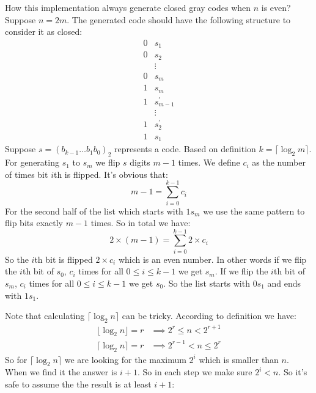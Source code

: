 \documentclass{book}
\begin{document}
	How this implementation always generate closed gray codes when $n$ is even? Suppose $n = 2m$. The generated code should have the following structure to consider it as closed:
	\begin{equation*}
		\begin{split}
		0&s_1 \\
		0&s_2 \\
		&\vdots \\
		0&s_m \\ 
		1&s_m \\
		1&s_{m - 1}^{\prime} \\
		&\vdots \\		
		1&s_2^{\prime} \\
		1&s_1
		\end{split}
	\end{equation*}
	Suppose $s = (b_{k - 1} \dots b_1 b_0)_2$ represents a code. Based on definition $k = \lceil \log_2{m} \rceil$. For generating $s_1$ to $s_m$ we flip $s$ digits $m - 1$ times. We define $c_i$ as the number of times bit $i$th is flipped. It's obvious that:
	\begin{equation*}
		m - 1 = \sum_{i = 0}^{k - 1}{c_i}
	\end{equation*}
	For the second half of the list which starts with $1s_m$ we use the same pattern to flip bits exactly $m - 1$ times. So in total we have:
	\begin{equation*}
		2 \times (m - 1) = \sum_{i = 0}^{k - 1}{2 \times c_i}
	\end{equation*}
	So the $i$th bit is flipped $2 \times c_i$ which is an even number. In other words if we flip the $i$th bit of $s_0$, $c_i$ times for all $0 \le i \le k - 1$ we get $s_m$. If we flip the $i$th bit of $s_m$, $c_i$ times for all $0 \le i \le k - 1$ we get $s_0$. So the list starts with $0s_1$ and ends with $1s_1$.
	\par Note that calculating $\lceil \log_2{n} \rceil$ can be tricky. According to definition we have:
	\begin{equation*}
		\begin{split}
			\lfloor \log_2{n} \rfloor = r &\implies 2^r \le n < 2^{r + 1} \\
			\lceil \log_2{n} \rceil = r &\implies 2^{r - 1} < n \le 2^r
		\end{split}
	\end{equation*}
	So for $\lceil \log_2{n} \rceil$ we are looking for the maximum $2^i$ which is smaller than $n$. When we find it the answer is $i + 1$. So in each step we make sure $2^i < n$. So it's safe to assume the the result is at least $i + 1$:
	
\end{document}
